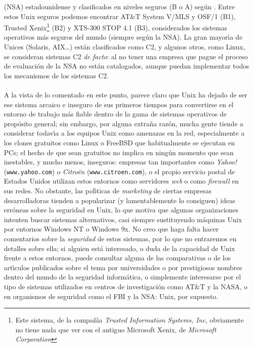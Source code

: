 (NSA) estadounidense y clasificados en niveles seguros (B o A) seg\'un 
\cite{kn:ora}. Entre estos Unix seguros podemos encontrar AT\&T System V/MLS y
OSF/1 (B1), Trusted Xenix\footnote{Este sistema, de la compa\~n\'{\i}a {\it 
Trusted Information Systems, Inc}, obviamente no tiene nada que ver con
el antiguo
Microsoft Xenix, de {\it Microsoft Corporation}} (B2) y XTS-300 STOP 4.1
(B3), considerados los sistemas operativos m\'as seguros del mundo (siempre 
seg\'un la NSA). La gran mayor\'{\i}a de Unices (Solaris, AIX\ldots) est\'an 
clasificados como C2, y algunos otros, como Linux, se consideran sistemas 
C2 {\it de facto}: al no tener una empresa que pague el proceso de evaluaci\'on
de la NSA no est\'an catalogados, aunque puedan implementar todos los 
mecanismos de los sistemas C2.\\
\\A la vista de lo comentado en este punto, parece claro que Unix ha dejado de
ser ese sistema arcaico e inseguro de sus primeros tiempos para convertirse en 
el entorno de trabajo 
m\'as fiable dentro de la gama de sistemas operativos de prop\'osito general; 
sin embargo, por alguna extra\~na raz\'on, mucha gente tiende a considerar 
todav\'{\i}a a los equipos Unix como amenazas en la red, especialmente a los
clones gratuitos como Linux o FreeBSD que habitualmente se ejecutan en PCs;
el hecho de que sean gratuitos no implica en ning\'un momento que sean 
inestables, y mucho menos, inseguros: empresas tan importantes como {\it Yahoo!}
({\tt www.yahoo.com}) o {\it Citro\"en} ({\tt www.citroen.com}), o el propio 
servicio postal de Estados Unidos utilizan estos entornos como servidores 
{\it web} o como {\it firewall} en sus redes. No obstante, las pol\'{\i}ticas 
de {\it marketing} de ciertas empresas desarrolladoras tienden a popularizar 
(y lamentablemente lo consiguen) ideas err\'oneas sobre la seguridad en Unix, 
lo que motiva que algunas organizaciones intenten buscar sistemas alternativos, 
casi siempre sustituyendo m\'aquinas Unix por entornos
Windows NT o Windows 9x. No creo que haga falta hacer comentarios sobre la 
{\it seguridad} de estos 
sistemas, por lo que no entraremos en detalles sobre ella; si
alguien est\'a interesado, o duda de la capacidad de Unix frente a estos 
entornos, puede consultar alguna de las comparativas o de los art\'{\i}culos 
publicados sobre el tema por universidades o por prestigiosos nombres dentro 
del mundo de la seguridad inform\'atica, o simplemente interesarse por el tipo
de sistemas utilizados en centros de investigaci\'on como AT\&T y la NASA, o 
en organismos de seguridad como el FBI y la NSA: Unix, por supuesto.
